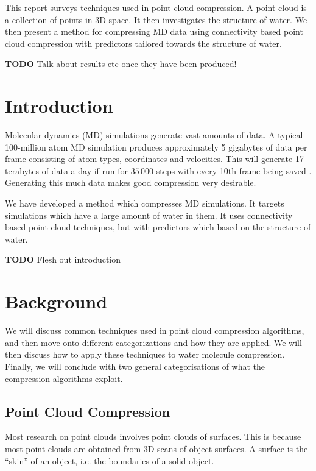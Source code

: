 \documentclass{report}
\begin{document}
This report surveys techniques used in point cloud compression. A point cloud
is a collection of points in 3D space. It then investigates the structure of
water. We then present a method for compressing MD data using connectivity
based point cloud compression with predictors tailored towards the structure
of water.

\textbf{TODO} Talk about results etc once they have been produced!

\tableofcontents

\chapter{Introduction}

Molecular dynamics (MD) simulations generate vast amounts of data. A typical
100-million atom MD simulation produces approximately 5 gigabytes of data per
frame consisting of atom types, coordinates and velocities. This will generate
17 terabytes of data a day if run for $35\,000$ steps with every 10th frame
being saved \cite{omeltchenko2000sls}. Generating this much data makes good
compression very desirable.

We have developed a method which compresses MD simulations. It targets
simulations which have a large amount of water in them. It uses connectivity
based point cloud techniques, but with predictors which based on the structure
of water.

\textbf{TODO} Flesh out introduction

\chapter{Background}

We will discuss common techniques used in point cloud compression algorithms,
and then move onto different categorizations and how they are applied. We will
then discuss how to apply these techniques to water molecule
compression. Finally, we will conclude with two general categorisations of
what the compression algorithms exploit.

\section{Point Cloud Compression}

Most research on point clouds involves point clouds of surfaces. This is
because most point clouds are obtained from 3D scans of object surfaces. A
surface is the ``skin'' of an object, i.e. the boundaries of a solid object.
\end{document}

